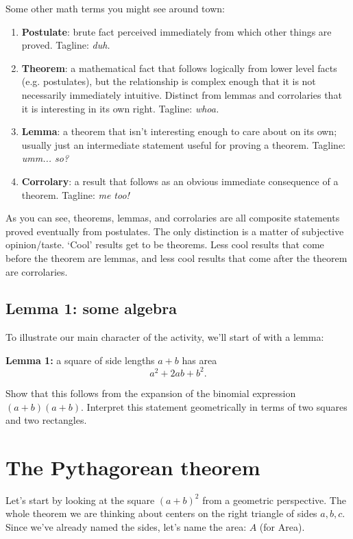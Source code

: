 \documentclass{handout}
\begin{document}
Some other math terms you might see around town:
\begin{enumerate}
    \item \textbf{Postulate}: brute fact perceived immediately from which other things are proved. Tagline: \emph{duh.}
    \item \textbf{Theorem}: a mathematical fact that follows logically from lower level facts (e.g. postulates), but the relationship is complex enough that it is not necessarily immediately intuitive. Distinct from lemmas and corrolaries that it is interesting in its own right. Tagline: \emph{whoa.}
    \item \textbf{Lemma}: a theorem that isn't interesting enough to care about on its own; usually just an intermediate statement useful for proving a theorem. Tagline: \emph{umm... so?}
    \item \textbf{Corrolary}: a result that follows as an obvious immediate consequence of a theorem. Tagline: \emph{me too!}
\end{enumerate}
As you can see, theorems, lemmas, and corrolaries are all composite statements proved eventually from postulates. The only distinction is a matter of subjective opinion/taste. `Cool' results get to be theorems. Less cool results that come before the theorem are lemmas, and less cool results that come after the theorem are corrolaries.

\subsection{Lemma 1: some algebra}
To illustrate our main character of the activity, we'll start of with a lemma: 

\textbf{Lemma 1:} a square of side lengths $a+b$ has area $$a^2 + 2 ab + b^2.$$

\begin{questions}
\question Show that this follows from the expansion of the binomial expression $(a+b)(a+b)$. 
\vspace{1in}
\question Interpret this statement geometrically in terms of two squares and two rectangles.
\vspace{1in}
\end{questions}

\section{The Pythagorean theorem}
Let's start by looking at the square $(a+b)^2$ from a geometric perspective. The whole theorem we are thinking about centers on the right triangle of sides $a,b,c$. Since we've already named the sides, let's name the area: $A$ (for Area). 
\end{document}
